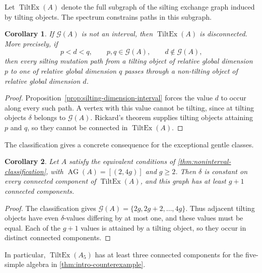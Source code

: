 \documentclass[11pt]{amsart}
\theoremstyle{definition}
\theoremstyle{plain}
\newtheorem{corollary}[corollary]{Corollary}
\theoremstyle{definition}
\theoremstyle{definition}
\newcommand{\AG}{\operatorname{AG}}
\newcommand{\GSpec}{\mathcal G}
\begin{document}
Let $\operatorname{TiltEx}(A)$ denote the full subgraph
of the silting exchange graph induced by tilting objects.
The spectrum constrains paths in this subgraph.

\begin{corollary}
\label{cor:intro-tilting-gap}
If $\GSpec(A)$ is not an interval, then
$\operatorname{TiltEx}(A)$ is disconnected.
More precisely, if
\[
 p<d<q,\qquad p,q\in\GSpec(A),\qquad d\notin\GSpec(A),
\]
then every silting mutation path from a tilting object
of relative global dimension $p$ to one of relative
global dimension $q$ passes through a non-tilting
object of relative global dimension $d$.
\end{corollary}

\begin{proof}
Proposition~\ref{prop:silting-dimension-interval}
forces the value $d$ to occur along every such path.
A vertex with this value cannot be tilting, since at
tilting objects $\delta$ belongs to $\GSpec(A)$.
Rickard's theorem supplies tilting objects attaining
$p$ and $q$, so they cannot be connected in
$\operatorname{TiltEx}(A)$.
\end{proof}

The classification gives a concrete consequence for
the exceptional gentle classes.

\begin{corollary}
\label{cor:classified-tilting-components}
Let $A$ satisfy the equivalent conditions of
\cref{thm:noninterval-classification}, with
$\AG(A)=[(2,4g)]$ and $g\geq2$.
Then $\delta$ is constant on every connected component
of $\operatorname{TiltEx}(A)$, and this graph has at
least $g+1$ connected components.
\end{corollary}

\begin{proof}
The classification gives
$\GSpec(A)=\{2g,2g+2,\ldots,4g\}$.
Thus adjacent tilting objects have even $\delta$-values
differing by at most one, and these values must be equal.
Each of the $g+1$ values is attained by a tilting object,
so they occur in distinct connected components.
\end{proof}

In particular, $\operatorname{TiltEx}(A_5)$ has at
least three connected components for the five-simple
algebra in \cref{thm:intro-counterexample}.
\end{document}
